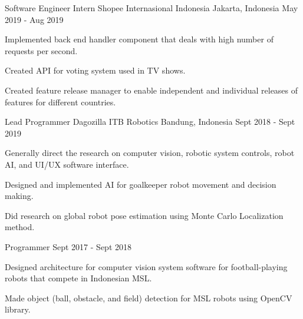 

\begin{cventries}

  \cventry
    {Software Engineer Intern} %
    {Shopee Internasional Indonesia} %
    {Jakarta, Indonesia} %
    {May 2019 - Aug 2019} %
    {
      \begin{cvitems} %
        \item {Implemented back end handler component that deals with high number of requests per second.}
        \item {Created API for voting system used in TV shows.}
        \item {Created feature release manager to enable independent and individual releases of features for different countries.}
      \end{cvitems}
    }


  \cventry
	{Lead Programmer} %
	{Dagozilla ITB Robotics} %
	{Bandung, Indonesia} %
	{Sept 2018 - Sept 2019} %
	{
	  \begin{cvitems} %
		\item {Generally direct the research on computer vision, robotic system controls, robot AI, and UI/UX software interface.}
		\item {Designed and implemented AI for goalkeeper robot movement and decision making.}
		\item {Did research on global robot pose estimation using Monte Carlo Localization method.}
	  \end{cvitems}
	}


  \cventry
	{Programmer} %
	{} %
	{} %
	{Sept 2017 - Sept 2018} %
	{
	  \begin{cvitems} %
		\item {Designed architecture for computer vision system software for football-playing robots that compete in Indonesian MSL.}
		\item {Made object (ball, obstacle, and field) detection for MSL robots using OpenCV library.}
	  \end{cvitems}
	}
\end{cventries}
